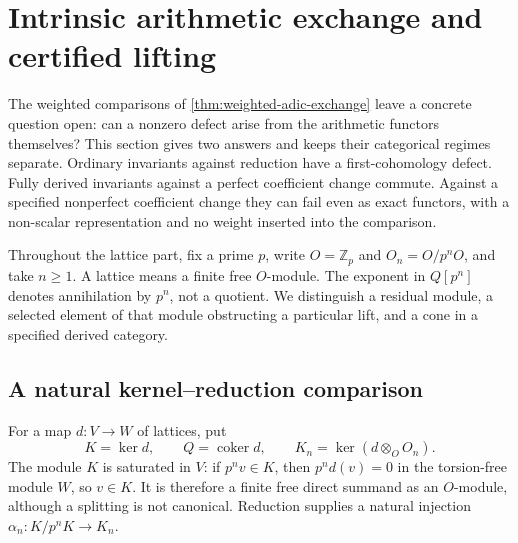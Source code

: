 \documentclass[11pt]{article}
\theoremstyle{definition}
\theoremstyle{remark}
\begin{document}
\section{Intrinsic arithmetic exchange and certified lifting}\label{sec:intrinsic-exchange}

The weighted comparisons of \cref{thm:weighted-adic-exchange} leave a concrete question open: can a nonzero defect arise from the arithmetic functors themselves? This section gives two answers and keeps their categorical regimes separate. Ordinary invariants against reduction have a first-cohomology defect. Fully derived invariants against a perfect coefficient change commute. Against a specified nonperfect coefficient change they can fail even as exact functors, with a non-scalar representation and no weight inserted into the comparison.

Throughout the lattice part, fix a prime $p$, write $O=\mathbb Z_p$ and $O_n=O/p^nO$, and take $n\geq1$. A lattice means a finite free $O$-module. The exponent in $Q[p^n]$ denotes annihilation by $p^n$, not a quotient. We distinguish a residual module, a selected element of that module obstructing a particular lift, and a cone in a specified derived category.

\subsection{A natural kernel--reduction comparison}

For a map $d:V\to W$ of lattices, put
\[
 K=\ker d,\qquad Q=\operatorname{coker}d,\qquad
 K_n=\ker(d\otimes_O O_n).
\]
The module $K$ is saturated in $V$: if $p^n v\in K$, then $p^n d(v)=0$ in the torsion-free module $W$, so $v\in K$. It is therefore a finite free direct summand as an $O$-module, although a splitting is not canonical. Reduction supplies a natural injection $\alpha_n:K/p^nK\to K_n$.
\end{document}
